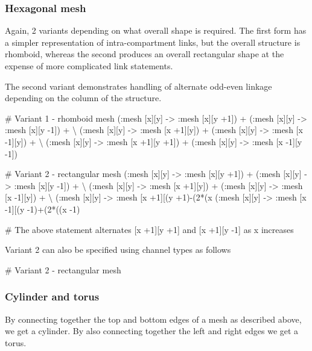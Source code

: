 \documentclass[english]{report}
\begin{document}
\subsubsection{Hexagonal mesh}

Again, 2 variants depending on what overall shape is required. The first form has a simpler representation of intra-compartment links, but the overall structure is rhomboid, whereas the second produces an overall rectangular shape at the expense of more complicated link statements.

The second variant demonstrates handling of alternate odd-even linkage depending on the column of the structure.

\begin{kappasource}

# Variant 1 - rhomboid mesh
    (:mesh [x][y] -> :mesh [x][y +1]) + (:mesh [x][y] -> :mesh [x][y -1]) + {\textbackslash}
    (:mesh [x][y] -> :mesh [x +1][y]) + (:mesh [x][y] -> :mesh [x -1][y]) + {\textbackslash}
    (:mesh [x][y] -> :mesh [x +1][y +1]) + (:mesh [x][y] -> :mesh [x -1][y -1])

# Variant 2 - rectangular mesh
    (:mesh [x][y] -> :mesh [x][y +1]) + (:mesh [x][y] -> :mesh [x][y -1]) + {\textbackslash}
    (:mesh [x][y] -> :mesh [x +1][y]) + (:mesh [x][y] -> :mesh [x -1][y]) + {\textbackslash}
    (:mesh [x][y] -> :mesh [x +1][(y +1)-(2*(x%
    (:mesh [x][y] -> :mesh [x -1][(y -1)+(2*((x -1)%

# The above statement alternates [x +1][y +1] and [x +1][y -1] as x increases
\end{kappasource}

Variant 2 can also be specified using channel types as follows

\begin{kappasource}

# Variant 2 - rectangular mesh
\end{kappasource}


\subsubsection{Cylinder and torus}

By connecting together the top and bottom edges of a mesh as described above, we get a cylinder. By also connecting together the left and right edges we get a torus.
\end{document}
